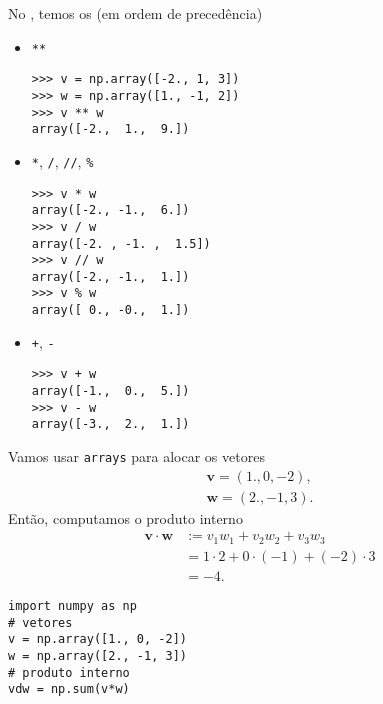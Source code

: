 No {\numpy}, temos os  (em ordem de precedência)
\begin{itemize}
\item \lstinline!**!

\begin{lstlisting}
>>> v = np.array([-2., 1, 3])
>>> w = np.array([1., -1, 2])
>>> v ** w
array([-2.,  1.,  9.])
\end{lstlisting}

\item \lstinline!*!, \lstinline!/!, \lstinline!//!, \lstinline!%!

\begin{lstlisting}
>>> v * w
array([-2., -1.,  6.])
>>> v / w
array([-2. , -1. ,  1.5])
>>> v // w
array([-2., -1.,  1.])
>>> v % w
array([ 0., -0.,  1.])
\end{lstlisting}

\item \lstinline!+!, \lstinline!-!

\begin{lstlisting}
>>> v + w
array([-1.,  0.,  5.])
>>> v - w
array([-3.,  2.,  1.])
\end{lstlisting}

\end{itemize}

\begin{ex}
  Vamos usar \lstinline+arrays+ para alocar os vetores
  \begin{align}
    \pmb{v} = (1., 0, -2),\\
    \pmb{w} = (2., -1, 3).
  \end{align}
  Então, computamos o produto interno
  \begin{subequations}
    \begin{align}
      \pmb{v}\cdot\pmb{w} &:= v_1w_1 + v_2w_2 + v_3w_3\\
                          &= 1\cdot 2 + 0\cdot(-1) + (-2)\cdot 3\\
                          &= -4.
    \end{align}
  \end{subequations}

\begin{lstlisting}
import numpy as np
# vetores
v = np.array([1., 0, -2])
w = np.array([2., -1, 3])
# produto interno
vdw = np.sum(v*w)
\end{lstlisting}

\end{ex}

